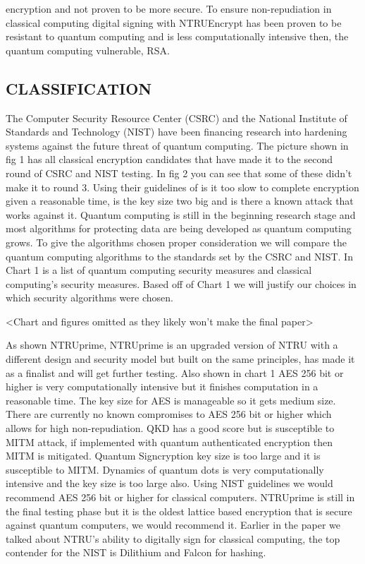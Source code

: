 \documentclass[sigconf]{acmart}
\begin{document}
encryption and not proven to be more secure. To ensure non-repudiation in classical computing digital signing with NTRUEncrypt has been proven to be resistant to quantum computing and is less computationally intensive then, the quantum computing vulnerable, RSA\cite{cheng_h._lightweight_2021}.

\subsection{CLASSIFICATION}

The Computer Security Resource Center (CSRC) and the National Institute of Standards and Technology (NIST) have been financing research into hardening systems against the future threat of quantum computing. The picture shown in fig 1 has all classical encryption candidates that have made it to the second round of CSRC and NIST testing. In fig 2 you can see that some of these didn’t make it to round 3. Using their guidelines of is it too slow to complete encryption given a reasonable time, is the key size two big and is there a known attack that works against it. Quantum computing is still in the beginning research stage and most algorithms for protecting data are being developed as quantum computing grows. To give the algorithms chosen proper consideration we will compare the quantum computing algorithms to the standards set by the CSRC and NIST. In Chart 1 is a list of quantum computing security measures and classical computing’s security measures. Based off of Chart 1 we will justify our choices in which security algorithms were chosen.

<Chart and figures omitted as they likely won't make the final paper>

As shown NTRUprime, NTRUprime is an upgraded version of NTRU with a different design and security model but built on the same principles, has made it as a finalist and will get further testing. Also shown in chart 1 AES 256 bit or higher is very computationally intensive but it finishes computation in a reasonable time. The key size for AES is manageable so it gets medium size. There are currently no known compromises to AES 256 bit or higher which allows for high non-repudiation. QKD has a good score but is susceptible to MITM attack, if implemented with quantum authenticated encryption then MITM is mitigated. Quantum Signcryption key size is too large and it is susceptible to MITM. Dynamics of quantum dots is very computationally intensive and the key size is too large also. Using NIST guidelines we would recommend AES 256 bit or higher for classical computers. NTRUprime is still in the final testing phase but it is the oldest lattice based encryption that is secure against quantum computers, we would recommend it. Earlier in the paper we talked about NTRU’s ability to digitally sign for classical computing, the top contender for the NIST is Dilithium and Falcon for hashing.
\end{document}

